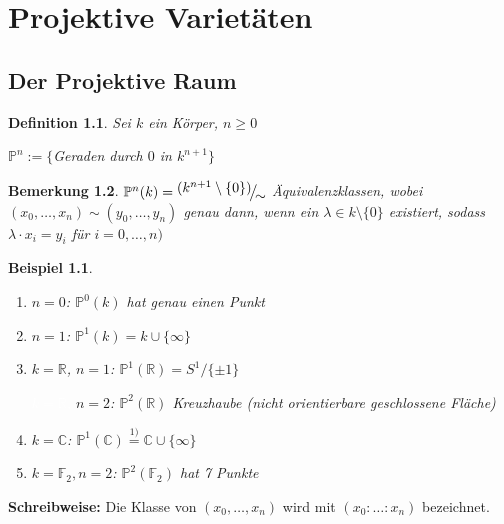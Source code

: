 \documentclass[a4paper, 12pt, numbers=noendperiod, chapterprefix=true]{scrbook}
\theoremstyle{break}
\newtheorem{Def}{Definition}[section]
\newtheorem{Bem}[Def]{Bemerkung}
\theoremstyle{nonumberbreak}
\newtheorem{nnBsp}{Beispiel}
\theoremstyle{nonumberplain}
\newcommand{\quot}[1]{\textrm{\glqq}{#1}\textrm{\grqq}}
\newcommand{\linetitle}[1]{\textbf{#1}}
\newcommand{\R}{\mathbb{R}}
\newcommand{\C}{\mathbb{C}}
\newcommand{\F}{\mathbb{F}}
\newcommand{\IP}{\mathbb{P}}%
\newcommand{\FakRaum}[2]{
  \raisebox{0.7ex}{\ensuremath{#1}}
  \ensuremath{\mkern-3mu}\big/\ensuremath{\mkern-3mu}
  \raisebox{-0.6ex}{\ensuremath{#2}}}
\begin{document}
\newpage

\chapter{Projektive Variet\"aten}
\setcounter{section}{8}
\section{Der Projektive Raum}

\begin{Def}
Sei $k$ ein K\"orper, $n\geq0$

$\IP^n:=\{$Geraden durch $0$ in $k^{n+1}$$\}$
\end{Def}

\begin{Bem}
$\IP^n(k)=\FakRaum{(k^{n+1} \setminus \{0 \})}{\sim}$ \"Aquivalenzklassen, wobei $(x_0,\dots ,x_n) \sim (y_0,\dots ,y_n)$ genau dann, wenn ein $\lambda \in k\setminus \{0\}$ existiert, sodass $\lambda \cdot x_i = y_i$ f\"ur $i=0,\dots ,n)$
\end{Bem}

\begin{nnBsp}\begin{enumerate}[1)]
\item[0)]
	$n=0$: $\IP^0(k)$ hat genau einen Punkt

\item
	$n=1$: $\IP^1(k)=k\cup\{\infty\}$

\item
	$k=\R$, $n=1$: $\IP^1(\R)=S^1/\{\pm 1\}$
	
	\textcolor{white}{$k=\R$, }$n=2$: $\IP^2(\R)$ \quot{Kreuzhaube} (nicht orientierbare geschlossene Fl\"ache)

\item
	$k=\C$: $\IP^1(\C) \overset{1)}{=} \C \cup \{\infty\}$

\item
	$k=\F_2, n=2$: $\IP^2(\F_2)$ hat 7 Punkte
\end{enumerate}\end{nnBsp}

\linetitle{Schreibweise:} Die Klasse von $(x_0,\dots ,x_n)$ wird mit $(x_0:\ldots :x_n)$ bezeichnet.
\end{document}
